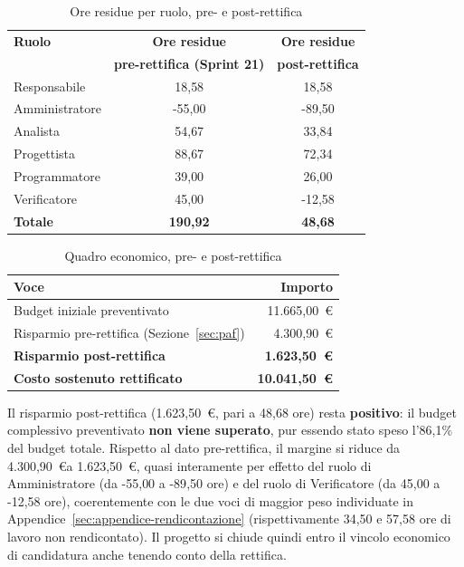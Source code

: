 \begin{table}[H]
\centering
\renewcommand{\arraystretch}{1.25}
\begin{tabular}{|l|c|c|}
\hline
\textbf{Ruolo} & \textbf{Ore residue} & \textbf{Ore residue} \\
 & \textbf{pre-rettifica (Sprint 21)} & \textbf{post-rettifica} \\
\hline
Responsabile   & 18{,}58 & 18{,}58 \\
Amministratore & -55{,}00 & -89{,}50 \\
Analista       & 54{,}67 & 33{,}84 \\
Progettista    & 88{,}67 & 72{,}34 \\
Programmatore  & 39{,}00 & 26{,}00 \\
Verificatore   & 45{,}00 & -12{,}58 \\
\hline
\textbf{Totale} & \textbf{190{,}92} & \textbf{48{,}68} \\
\hline
\end{tabular}
\caption{Ore residue per ruolo, pre- e post-rettifica}
\label{tab:paf-rettifica-ore}
\end{table}

\begin{table}[H]
\centering
\renewcommand{\arraystretch}{1.25}
\begin{tabular}{lr}
\toprule
\textbf{Voce} & \textbf{Importo} \\
\midrule
Budget iniziale preventivato & 11.665{,}00~\euro \\
Risparmio pre-rettifica (Sezione~\ref{sec:paf}) & 4.300{,}90~\euro \\
\textbf{Risparmio post-rettifica} & \textbf{1.623{,}50~\euro} \\
\midrule
\textbf{Costo sostenuto rettificato} & \textbf{10.041{,}50~\euro} \\
\bottomrule
\end{tabular}
\caption{Quadro economico, pre- e post-rettifica}
\label{tab:paf-rettifica-costo}
\end{table}

Il risparmio post-rettifica (1.623{,}50~\euro, pari a 48{,}68 ore) resta
\textbf{positivo}: il budget complessivo preventivato \textbf{non viene
superato}, pur essendo stato speso l'86{,}1\% del budget totale. Rispetto
al dato pre-rettifica, il margine si riduce da 4.300{,}90~\euro  a
1.623{,}50~\euro, quasi interamente per effetto del ruolo di
Amministratore (da -55{,}00 a -89{,}50 ore) e del ruolo di Verificatore (da
45{,}00 a -12{,}58 ore), coerentemente con le due voci di maggior peso
individuate in Appendice~\ref{sec:appendice-rendicontazione}
(rispettivamente 34{,}50 e 57{,}58 ore di lavoro non rendicontato). Il
progetto si chiude quindi entro il vincolo economico di candidatura anche
tenendo conto della rettifica.